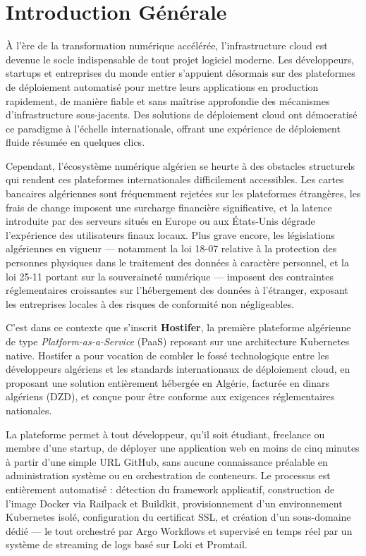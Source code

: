 \chapter*{Introduction Générale\label{intro}}

À l'ère de la transformation numérique accélérée, l'infrastructure cloud est devenue le socle
indispensable de tout projet logiciel moderne. Les développeurs, startups et entreprises du monde
entier s'appuient désormais sur des plateformes de déploiement automatisé pour mettre leurs
applications en production rapidement, de manière fiable et sans maîtrise approfondie des
mécanismes d'infrastructure sous-jacents. Des solutions de déploiement cloud ont démocratisé ce
paradigme à l'échelle internationale, offrant une expérience de déploiement fluide résumée en
quelques clics.

Cependant, l'écosystème numérique algérien se heurte à des obstacles structurels qui rendent ces
plateformes internationales difficilement accessibles. Les cartes bancaires algériennes sont
fréquemment rejetées sur les plateformes étrangères, les frais de change imposent une surcharge
financière significative, et la latence introduite par des serveurs situés en Europe ou aux
États-Unis dégrade l'expérience des utilisateurs finaux locaux. Plus grave encore, les législations
algériennes en vigueur — notamment la loi 18-07 relative à la protection des personnes physiques
dans le traitement des données à caractère personnel, et la loi 25-11 portant sur la souveraineté
numérique — imposent des contraintes réglementaires croissantes sur l'hébergement des données
à l'étranger, exposant les entreprises locales à des risques de conformité non négligeables.

C'est dans ce contexte que s'inscrit \textbf{Hostifer}, la première plateforme algérienne de type
\textit{Platform-as-a-Service} (PaaS) reposant sur une architecture Kubernetes native. Hostifer
a pour vocation de combler le fossé technologique entre les développeurs algériens et les standards
internationaux de déploiement cloud, en proposant une solution entièrement hébergée en Algérie,
facturée en dinars algériens (DZD), et conçue pour être conforme aux exigences réglementaires
nationales.

La plateforme permet à tout développeur, qu'il soit étudiant, freelance ou membre d'une startup,
de déployer une application web en moins de cinq minutes à partir d'une simple URL GitHub, sans
aucune connaissance préalable en administration système ou en orchestration de conteneurs. Le
processus est entièrement automatisé : détection du framework applicatif, construction de l'image
Docker via Railpack et Buildkit, provisionnement d'un environnement Kubernetes isolé, configuration
du certificat SSL, et création d'un sous-domaine dédié — le tout orchestré par Argo Workflows et
supervisé en temps réel par un système de streaming de logs basé sur Loki et Promtail.


